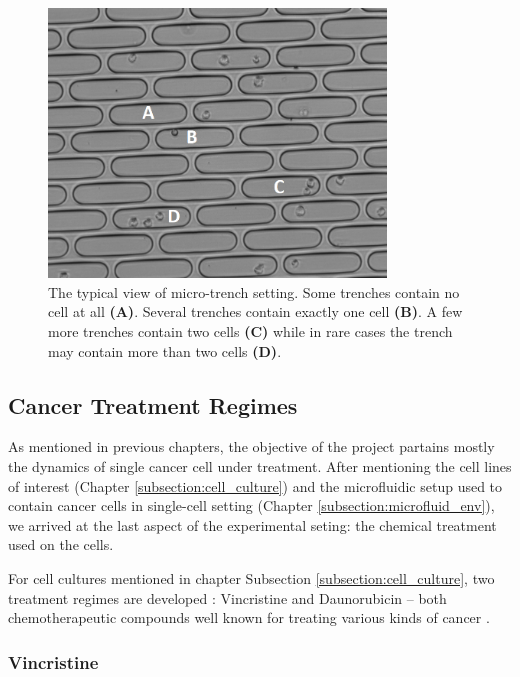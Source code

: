 \documentclass[pdftex,12pt,a4paper]{report}
\begin{document}
\begin{figure}[H]
\centering
\includegraphics[width=0.8\textwidth]{images/microtrench_in}
\caption{The typical view of micro-trench setting. Some trenches contain no cell at all \textbf{(A)}. Several trenches contain exactly one cell \textbf{(B)}. A few more trenches contain two cells \textbf{(C)} while in rare cases the trench may contain more than two cells \textbf{(D)}.}
\label{fig:microtrench_sample}
\end{figure}

\subsection{Cancer Treatment Regimes}
\label{subsection:treatment}

As mentioned in previous chapters, the objective of the project partains mostly the dynamics of single cancer cell under treatment. After mentioning the cell lines of interest (Chapter \ref{subsection:cell_culture}) and the microfluidic setup used to contain cancer cells in single-cell setting (Chapter \ref{subsection:microfluid_env}), we arrived at the last aspect of the experimental seting: the chemical treatment used on the cells.

For cell cultures mentioned in chapter Subsection \ref{subsection:cell_culture}, two treatment regimes are developed : Vincristine and Daunorubicin -- both chemotherapeutic compounds well known for treating various kinds of cancer \cite{drugs2018defdaunorubicin, ravina2011evolution, tsuruo1981overcoming, gewirtz1999critical}.

\subsubsection*{Vincristine}
\end{document}
